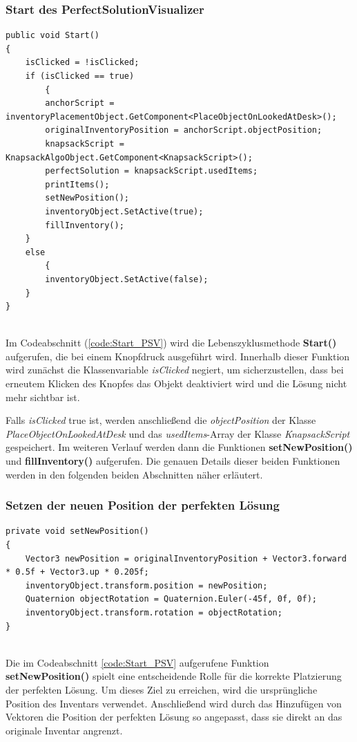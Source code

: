 \subsubsection{Start des PerfectSolutionVisualizer}
\begin{lstlisting}[style=csharp, caption={PerfectSolutionVisualizer Start}, label=code:Start_PSV]
public void Start()
{
    isClicked = !isClicked;
    if (isClicked == true)
        {
        anchorScript = inventoryPlacementObject.GetComponent<PlaceObjectOnLookedAtDesk>();
        originalInventoryPosition = anchorScript.objectPosition;
        knapsackScript = KnapsackAlgoObject.GetComponent<KnapsackScript>();
        perfectSolution = knapsackScript.usedItems;
        printItems();
        setNewPosition();
        inventoryObject.SetActive(true);
        fillInventory();
    }
    else
        {
        inventoryObject.SetActive(false);
    }
}
\end{lstlisting}\\
Im Codeabschnitt (\ref{code:Start_PSV}) wird die Lebenszyklusmethode \textbf{Start()} aufgerufen, die bei einem Knopfdruck
ausgeführt wird. Innerhalb dieser Funktion wird zunächst die Klassenvariable \textit{isClicked} negiert, um sicherzustellen,
dass bei erneutem Klicken des Knopfes das Objekt deaktiviert wird und die Lösung nicht mehr sichtbar ist.

Falls \textit{isClicked} true ist, werden anschließend die \textit{objectPosition} der Klasse \textit{PlaceObjectOnLookedAtDesk}
und das \textit{usedItems}-Array der Klasse \textit{KnapsackScript} gespeichert. Im weiteren Verlauf werden dann die
Funktionen \textbf{setNewPosition()} und \textbf{fillInventory()} aufgerufen. Die genauen Details dieser beiden Funktionen
werden in den folgenden beiden Abschnitten näher erläutert.

\subsubsection{Setzen der neuen Position der perfekten Lösung}
\begin{lstlisting}[style=csharp, caption={Neue Position setzen}, label=code:newPos_PSV]
private void setNewPosition()
{
    Vector3 newPosition = originalInventoryPosition + Vector3.forward * 0.5f + Vector3.up * 0.205f;
    inventoryObject.transform.position = newPosition;
    Quaternion objectRotation = Quaternion.Euler(-45f, 0f, 0f);
    inventoryObject.transform.rotation = objectRotation;
}
\end{lstlisting}\\
Die im Codeabschnitt \ref{code:Start_PSV} aufgerufene Funktion \textbf{setNewPosition()} spielt eine entscheidende Rolle
für die korrekte Platzierung der perfekten Lösung. Um dieses Ziel zu erreichen, wird die ursprüngliche Position des
Inventars verwendet. Anschließend wird durch das Hinzufügen von Vektoren die Position der perfekten Lösung so angepasst,
dass sie direkt an das originale Inventar angrenzt.

